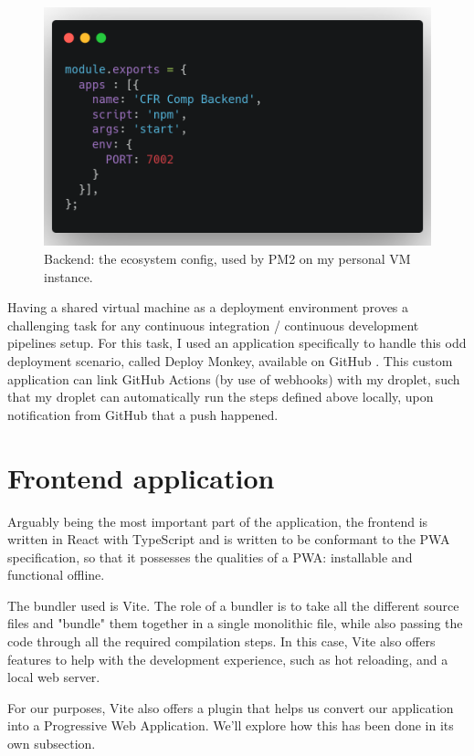 \begin{figure}[htbp]
    \centering
    \includegraphics[width=.8\textwidth]{./figures/code/be_ecosystem-config.png}
    \caption{Backend: the ecosystem config, used by PM2 on my personal VM instance.}
    \label{FigBeEcosystemConfig}
\end{figure}

Having a shared virtual machine as a deployment environment proves a challenging task for any continuous integration / continuous development pipelines setup. For this task, I used an application specifically to handle this odd deployment scenario, called Deploy Monkey, available on GitHub \cite{DeployMonkey}. This custom application can link GitHub Actions (by use of webhooks) with my droplet, such that my droplet can automatically run the steps defined above locally, upon notification from GitHub that a push happened.

\section{Frontend application}
Arguably being the most important part of the application, the frontend is written in React with TypeScript and is written to be conformant to the PWA specification, so that it possesses the qualities of a PWA: installable and functional offline.

The bundler used is Vite. The role of a bundler is to take all the different source files and "bundle" them together in a single monolithic file, while also passing the code through all the required compilation steps. In this case, Vite also offers features to help with the development experience, such as hot reloading, and a local web server.

For our purposes, Vite also offers a plugin that helps us convert our application into a Progressive Web Application. We'll explore how this has been done in its own subsection.

